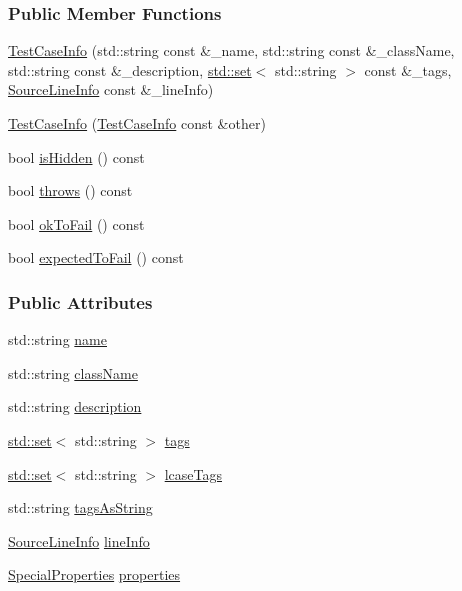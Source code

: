 \subsubsection*{Public Member Functions}
\begin{DoxyCompactItemize}
\item 
\hyperlink{a00086_a35ec65315e0d1f178491b5a59f3f3123}{Test\+Case\+Info} (std\+::string const \&\+\_\+name, std\+::string const \&\+\_\+class\+Name, std\+::string const \&\+\_\+description, \hyperlink{a00100_aea2a22e88db44fc95ff2349666eab45f}{std\+::set}$<$ std\+::string $>$ const \&\+\_\+tags, \hyperlink{a00075}{Source\+Line\+Info} const \&\+\_\+line\+Info)
\item 
\hyperlink{a00086_ac338adb4e38f4bf3977fb45b2b1fe447}{Test\+Case\+Info} (\hyperlink{a00086}{Test\+Case\+Info} const \&other)
\item 
bool \hyperlink{a00086_a01ac8b11d8c105e5278a239ab5214257}{is\+Hidden} () const 
\item 
bool \hyperlink{a00086_a19fb4f0b755956eee8a1fecf713fb7ca}{throws} () const 
\item 
bool \hyperlink{a00086_a64586336bb49bd6e9ef8a089b072a712}{ok\+To\+Fail} () const 
\item 
bool \hyperlink{a00086_a1ed1c3689c2874c421466945bd3cb75c}{expected\+To\+Fail} () const 
\end{DoxyCompactItemize}
\subsubsection*{Public Attributes}
\begin{DoxyCompactItemize}
\item 
std\+::string \hyperlink{a00086_a463794e2f5cfead307c93efd134ade36}{name}
\item 
std\+::string \hyperlink{a00086_a1a5e0825132a38d091defdebbf2f8ce9}{class\+Name}
\item 
std\+::string \hyperlink{a00086_a37fe2db9425bc45f6a33893eac31198e}{description}
\item 
\hyperlink{a00100_aea2a22e88db44fc95ff2349666eab45f}{std\+::set}$<$ std\+::string $>$ \hyperlink{a00086_a045f62e7719a8760a5b456f7fd2dc97c}{tags}
\item 
\hyperlink{a00100_aea2a22e88db44fc95ff2349666eab45f}{std\+::set}$<$ std\+::string $>$ \hyperlink{a00086_a0ed3864a313e8ddc3ae38431be5be9ae}{lcase\+Tags}
\item 
std\+::string \hyperlink{a00086_ac65c2d36fd36f71e9bf782b2ea245c64}{tags\+As\+String}
\item 
\hyperlink{a00075}{Source\+Line\+Info} \hyperlink{a00086_aa9407b7f442655b51a2aad24b3fa2fd3}{line\+Info}
\item 
\hyperlink{a00086_a39b232f74b4a7a6f2183b96759027eac}{Special\+Properties} \hyperlink{a00086_afc1e84bd7a2e180895a06d9131302af0}{properties}
\end{DoxyCompactItemize}


